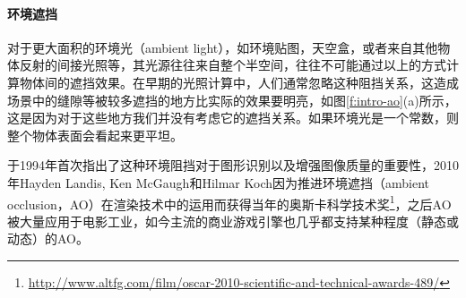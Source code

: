 \paragraph{环境遮挡}
对于更大面积的环境光（ambient light），如环境贴图，天空盒，或者来自其他物体反射的间接光照等，其光源往往来自整个半空间，往往不可能通过以上的方式计算物体间的遮挡效果。在早期的光照计算中，人们通常忽略这种阻挡关系，这造成场景中的缝隙等被较多遮挡的地方比实际的效果要明亮，如图\ref{f:intro-ao}(a)所示，这是因为对于这些地方我们并没有考虑它的遮挡关系。如果环境光是一个常数，则整个物体表面会看起来更平坦。

\cite{a:Shape-from-shadingonacloudyday}于1994年首次指出了这种环境阻挡对于图形识别以及增强图像质量的重要性，2010年Hayden Landis, Ken McGaugh和Hilmar Koch因为推进环境遮挡（ambient occlusion，AO）在渲染技术中的运用而获得当年的奥斯卡科学技术奖\footnote{\url{http://www.altfg.com/film/oscar-2010-scientific-and-technical-awards-489/}}，之后AO被大量应用于电影工业，如今主流的商业游戏引擎也几乎都支持某种程度（静态或动态）的AO。

